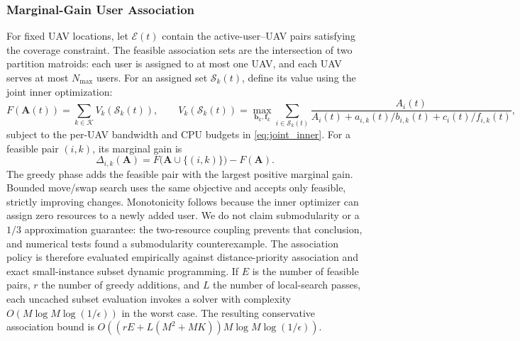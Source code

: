 \documentclass[journal]{IEEEtran}
\begin{document}
\subsubsection{Marginal-Gain User Association}\label{subsubsec:association}
For fixed UAV locations, let $\mathcal{E}(t)$ contain the active-user--UAV
pairs satisfying the coverage constraint. The feasible association sets are
the intersection of two partition matroids: each user is assigned to at most
one UAV, and each UAV serves at most $N_{\max}$ users. For an assigned set
$\mathcal{S}_k(t)$, define its value using the joint inner optimization:
\begin{equation}\label{eq:association_objective}
  F(\bm{A}(t)) = \sum_{k\in\mathcal{K}} V_k(\mathcal{S}_k(t)), \qquad
  V_k(\mathcal{S}_k(t)) =
  \max_{\bm{b}_k,\bm{f}_k}
  \sum_{i\in\mathcal{S}_k(t)}
  \frac{A_i(t)}
  {A_i(t)+a_{i,k}(t)/b_{i,k}(t)+c_i(t)/f_{i,k}(t)},
\end{equation}
subject to the per-UAV bandwidth and CPU budgets in
\eqref{eq:joint_inner}. For a feasible pair $(i,k)$, its marginal gain is
\begin{equation}\label{eq:association_marginal}
  \Delta_{i,k}(\bm{A}) =
  F\bigl(\bm{A}\cup\{(i,k)\}\bigr)-F(\bm{A}).
\end{equation}
The greedy phase adds the feasible pair with the largest positive marginal
gain. Bounded move/swap search uses the same objective and accepts only
feasible, strictly improving changes. Monotonicity follows because the inner
optimizer can assign zero resources to a newly added user. We do not claim
submodularity or a $1/3$ approximation guarantee: the two-resource coupling
prevents that conclusion, and numerical tests found a submodularity
counterexample. The association policy is therefore evaluated empirically
against distance-priority association and exact small-instance subset
dynamic programming. If $E$ is the number of feasible pairs, $r$ the number
of greedy additions, and $L$ the number of local-search passes, each uncached
subset evaluation invokes a solver with complexity
$O(M\log M\log(1/\epsilon))$ in the worst case. The resulting conservative
association bound is
$O((rE+L(M^2+MK))M\log M\log(1/\epsilon))$.
\end{document}
